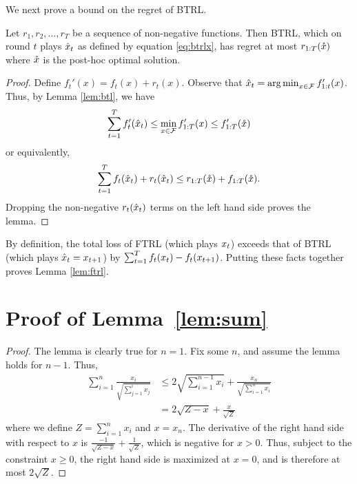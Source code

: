 {We next prove a bound on the regret of BTRL.

\begin {lemma} \label {lem:btrl}
Let $r_1, r_2, \ldots, r_T$ be a sequence of non-negative functions.
Then BTRL, which on round $t$
plays $\hat{x}_t$ as defined by equation \eqref {eq:btrlx}, has regret at
most $r_{1:T}(\mathring{x})$ where $\mathring{x}$ is the post-hoc optimal solution.
\end {lemma}

\begin {proof}
Define $f_t'(x) = f_t (x) + r_t(x)$.  Observe that $\hat{x}_t = \mathop{\rm arg\,min}_{x \in \mathcal{F}} f'_{1:t}(x)$.
  Thus, by Lemma \ref {lem:btl}, we have
\[
\sum_{t=1}^T f_t'(\hat{x}_t) \le \min_{x \in \mathcal{F}} f'_{1:T}(x) \le f'_{1:T}(\mathring{x})
\]
or equivalently,
\[
\sum_{t=1}^T f_t (\hat{x}_t) + r_t(\hat{x}_t)
  \leq r_{1:T}(\mathring{x}) + f_{1:T}(\mathring{x}) .
\]
Dropping the non-negative $r_t(\hat{x}_t)$ terms on the left
hand side proves the lemma.
\end {proof}

By definition, the total loss of FTRL (which plays $x_t$) exceeds that
of BTRL (which plays $\hat{x}_t = x_{t+1}$) by $\sum_{t=1}^T f_t (x_t) - f_t(x_{t+1})$.
Putting these facts together proves Lemma \ref {lem:ftrl}.

\section{Proof of Lemma~\ref{lem:sum}}\label{ap:lem_sum_proof}
\begin {proof}
The lemma is clearly true for $n = 1$.  Fix some $n$, and assume the
lemma holds for $n - 1$.  Thus,
\begin {align*}
	\sum_{i=1}^n \frac { x_i } { \sqrt { \sum_{j=1}^i x_j } }
& \le  2 \sqrt { \sum_{i=1}^{n-1} x_i }
  + \frac { x_n } { \sqrt { \sum_{i=1}^n x_i } } \\
& = 2 \sqrt {Z - x} + \frac {x} { \sqrt { Z } }
\end {align*}
where we define $Z = \sum_{i=1}^{n} x_i$ and $x = x_n$.  The
derivative of the right hand side with respect to $x$ is $\frac {-1}
{\sqrt {Z -x}} + \frac {1} {\sqrt Z}$, which is negative for $x > 0$.
Thus, subject to the constraint $x \ge 0$,
the right hand side is maximized at $x = 0$, and is
therefore at most $2 \sqrt Z$.
\end {proof}
} %


